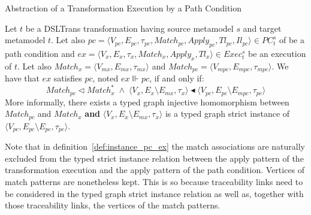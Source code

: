\begin{definition}{Abstraction of a Transformation Execution by a Path Condition}
\label{def:instance_pc_ex}

Let $t$ be a DSLTrans transformation having source metamodel $s$ and target
metamodel $t$. Let also $pc = \langle
V_{pc},E_{pc},\tau_{pc},Match_{pc},Apply_{pc},Tl_{pc},Il_{pc}\rangle \in
PC^{s}_{t}$ of be a path condition and $ex = \langle
V_x,E_x,\tau_x,Match_x,Apply_x,Tl_x\rangle \in Exec^{s}_{t}$ be an execution of
$t$. Let also $Match_x = \langle V_{mx},E_{mx},\tau_{mx}\rangle$ and $Match_{pc}
= \langle V_{mpc},E_{mpc},\tau_{mpc}\rangle$. We have that $ex$ satisfies $pc$,
noted $ex\Vvdash pc$, if and only if:
$$Match_{pc} \vartriangleleft Match^*_x \;\land\; \langle V_x,E_x\setminus
E_{mx},\tau_x\rangle \blacktriangleleft \langle V_{pc},E_{pc}\setminus
E_{mpc},\tau_{pc}\rangle$$ More informally, there exists a typed graph injective
homomorphism between $Match_{pc}$ and $Match_x$   \textbf{and} $\langle V_x,E_x\setminus E_{mx},\tau_x\rangle$
is a typed graph strict instance of $\langle V_{pc},E_{pc}\setminus
E_{pc},\tau_{pc}\rangle$.

\end{definition}

Note that in definition~\ref{def:instance_pc_ex} the match associations are naturally excluded from the typed strict instance relation between the apply pattern of the transformation execution and the apply pattern of the path condition. Vertices of match patterns are nonetheless kept. This is so because traceability links need to be considered in the typed graph strict instance relation as well as, together with those traceability links, the vertices of the match patterns.  


